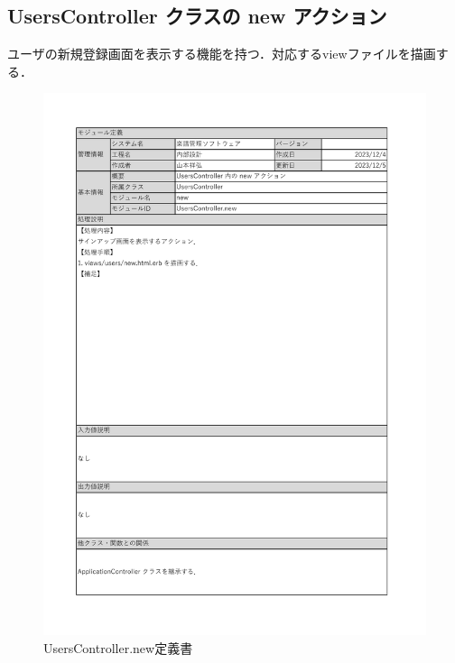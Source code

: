 \subsection*{UsersController クラスの new アクション}
ユーザの新規登録画面を表示する機能を持つ．対応するviewファイルを描画する．
\begin{figure}[H]
    \centering
    \includegraphics[scale=0.6]{img/Users/xlsx/UsersController_new.pdf}
    \vspace{-1cm}
    \caption{UsersController.new定義書}
\end{figure}
